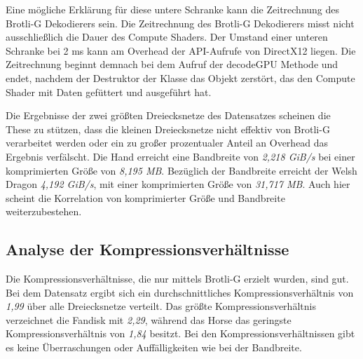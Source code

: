 Eine mögliche Erklärung für diese untere Schranke kann die Zeitrechnung des Brotli-G Dekodierers sein.
Die Zeitrechnung des Brotli-G Dekodierers misst nicht ausschließlich die Dauer des Compute Shaders.
Der Umstand einer unteren Schranke bei 2 ms kann am Overhead der API-Aufrufe von DirectX12 liegen.
Die Zeitrechnung beginnt demnach bei dem Aufruf der decodeGPU Methode und endet, nachdem der Destruktor der Klasse das Objekt zerstört, das den Compute Shader mit Daten gefüttert und ausgeführt hat. \newline

Die Ergebnisse der zwei größten Dreiecksnetze des Datensatzes scheinen die These zu stützen, dass die kleinen Dreiecksnetze nicht effektiv von Brotli-G verarbeitet werden oder ein zu großer prozentualer Anteil an Overhead das Ergebnis verfälscht.
Die Hand erreicht eine Bandbreite von \textit{2,218 GiB/s} bei einer komprimierten Größe von \textit{8,195 MB}.
Bezüglich der Bandbreite erreicht der Welsh Dragon \textit{4,192 GiB/s}, mit einer komprimierten Größe von \textit{31,717 MB}.
Auch hier scheint die Korrelation von komprimierter Größe und Bandbreite weiterzubestehen.

\subsection{Analyse der Kompressionsverhältnisse}
\label{subsec:ana_ratios}
Die Kompressionsverhältnisse, die nur mittels Brotli-G erzielt wurden, sind gut.
Bei dem Datensatz ergibt sich ein durchschnittliches Kompressionsverhältnis von \textit{1,99} über alle Dreiecksnetze verteilt.
Das größte Kompressionsverhältnis verzeichnet die Fandisk mit \textit{2,29}, während das Horse das geringste Kompressionsverhältnis von \textit{1,84} besitzt.
Bei den Kompressionsverhältnissen gibt es keine Überraschungen oder Auffälligkeiten wie bei der Bandbreite.

